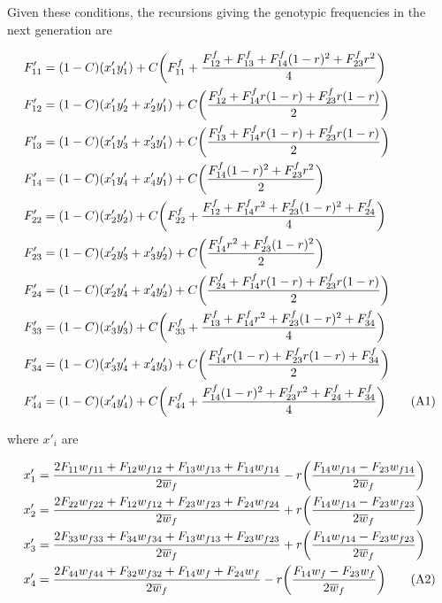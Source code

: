 \documentclass{article}
\newcommand\numberthis{\addtocounter{equation}{1}\tag{\theequation}}
\begin{document}
\noindent{} Given these conditions, the recursions giving the genotypic frequencies in the next generation are \citep{Holden1979, JordanConnallon2014}


\begin{align*}
	F'_{11} &= (1 - C) (x'_1 y'_1)           + C \bigg( F^f_{11} + \frac{F^f_{12} + F^f_{13} + F^f_{14}(1 - r)^2 + F^f_{23} r^2}{4} \bigg)  \\
	F'_{12} &= (1 - C) (x'_1 y'_2 + x'_2 y'_1) + C \bigg( \frac{F^f_{12} + F^f_{14} r(1-r) + F^f_{23} r(1-r)}{2} \bigg)  \\
	F'_{13} &= (1 - C) (x'_1 y'_3 + x'_3 y'_1) + C \bigg( \frac{F^f_{13} + F^f_{14} r(1-r) + F^f_{23} r(1-r)}{2} \bigg)  \\
	F'_{14} &= (1 - C) (x'_1 y'_4 + x'_4 y'_1) + C \bigg( \frac{F^f_{14} (1-r)^2 + F^f_{23} r^2}{2} \bigg)  \\
	F'_{22} &= (1 - C) (x'_2 y'_2)           + C \bigg( F^f_{22} + \frac{F^f_{12} + F^f_{14} r^2 + F^f_{23} (1-r)^2 + F^f_{24}}{4} \bigg)  \\
	F'_{23} &= (1 - C) (x'_2 y'_3 + x'_3 y'_2) + C \bigg( \frac{F^f_{14} r^2 + F^f_{23} (1-r)^2}{2} \bigg)  \\
	F'_{24} &= (1 - C) (x'_2 y'_4 + x'_4 y'_2) + C \bigg( \frac{F^f_{24} + F^f_{14} r(1-r) + F^f_{23} r(1-r)}{2} \bigg)  \\
	F'_{33} &= (1 - C) (x'_3 y'_3)           + C \bigg( F^f_{33} + \frac{F^f_{13} + F^f_{14} r^2 + F^f_{23} (1-r)^2 + F^f_{34}}{4} \bigg)  \\
	F'_{34} &= (1 - C) (x'_3 y'_4 + x'_4 y'_3) + C \bigg( \frac{F^f_{14} r(1-r) + F^f_{23} r(1-r) + F^f_{34}}{2} \bigg)  \\
	F'_{44} &= (1 - C) (x'_4 y'_4)           + C \bigg( F^f_{44} + \frac{F^f_{14} (1-r)^2 + F^f_{23} r^2 + F^f_{24} + F^f_{34}}{4} \bigg)  \numberthis
\end{align*}

\noindent{} where $x'_{i}$ are

\begin{align*}
	x'_1 &= \frac{2 F_{11} w_{f11} + F_{12} w_{f12} + F_{13} w_{f13} + F_{14} w_{f14}}{2 \overline{w}_f} - r \bigg( \frac{F_{14} w_{f14} - F_{23} w_{f14}}{2 \overline{w}_f} \bigg) \\
	x'_2 &= \frac{2 F_{22} w_{f22} + F_{12} w_{f12} + F_{23} w_{f23} + F_{24} w_{f24}}{2 \overline{w}_f} + r \bigg( \frac{F_{14} w_{f14} - F_{23} w_{f23}}{2 \overline{w}_f} \bigg) \\
	x'_3 &= \frac{2 F_{33} w_{f33} + F_{34} w_{f34} + F_{13} w_{f13} + F_{23} w_{f23}}{2 \overline{w}_f} + r \bigg( \frac{F_{14} w_{f14} - F_{23} w_{f23}}{2 \overline{w}_f} \bigg) \\
	x'_4 &= \frac{2 F_{44} w_{f44} + F_{32} w_{f32} + F_{14} w_{f} + F_{24} w_{f}}{2 \overline{w}_f} - r \bigg( \frac{F_{14} w_{f} - F_{23} w_{f}}{2 \overline{w}_f} \bigg) \numberthis
\end{align*}
\end{document}

